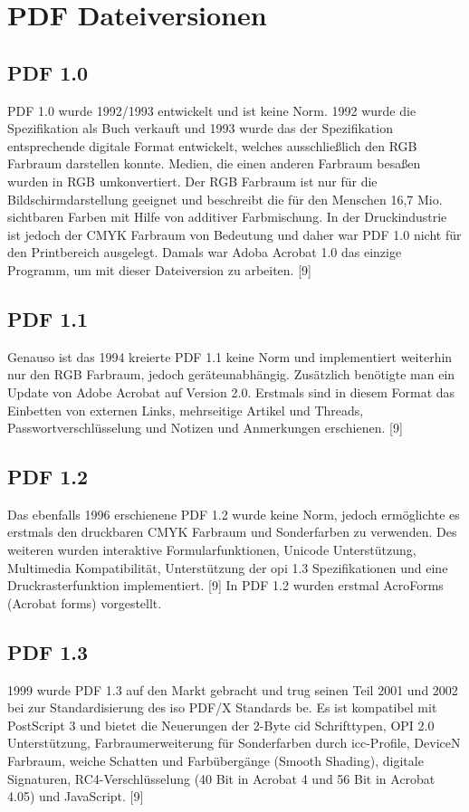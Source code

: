 \section{PDF Dateiversionen}

\subsection{PDF 1.0}
PDF 1.0 wurde 1992/1993 entwickelt und ist keine Norm. 1992 wurde die Spezifikation als Buch verkauft und 1993 wurde das der Spezifikation entsprechende digitale Format entwickelt, welches ausschließlich den RGB Farbraum darstellen konnte. Medien, die einen anderen Farbraum besaßen wurden in RGB umkonvertiert. Der RGB Farbraum ist nur für die Bildschirmdarstellung geeignet und beschreibt die für den Menschen 16,7 Mio. sichtbaren Farben mit Hilfe von additiver Farbmischung. In der Druckindustrie ist jedoch der CMYK Farbraum von Bedeutung und daher war PDF 1.0 nicht für den Printbereich ausgelegt. Damals war Adoba Acrobat 1.0 das einzige Programm, um mit dieser Dateiversion zu arbeiten. [9]

\subsection{PDF 1.1}
Genauso ist das 1994 kreierte PDF 1.1 keine Norm und implementiert weiterhin nur den RGB Farbraum, jedoch geräteunabhängig. Zusätzlich benötigte man ein Update von Adobe Acrobat auf Version 2.0. Erstmals sind in diesem Format das Einbetten von externen Links, mehrseitige Artikel und Threads, Passwortverschlüsselung und Notizen und Anmerkungen erschienen. [9]

\subsection{PDF 1.2}
Das ebenfalls 1996 erschienene PDF 1.2 wurde keine Norm, jedoch ermöglichte es erstmals den druckbaren CMYK Farbraum und Sonderfarben zu verwenden. Des weiteren wurden interaktive Formularfunktionen, Unicode Unterstützung, Multimedia Kompatibilität, Unterstützung der \gls{opi} 1.3 Spezifikationen und eine Druckrasterfunktion implementiert. [9] In PDF 1.2 wurden erstmal AcroForms (Acrobat forms) vorgestellt.

\subsection{PDF 1.3}
1999 wurde PDF 1.3 auf den Markt gebracht und trug seinen Teil 2001 und 2002 bei zur Standardisierung des \gls{iso} PDF/X Standards be. Es ist kompatibel mit PostScript 3 und bietet die Neuerungen der 2-Byte \gls{cid} Schrifttypen, OPI 2.0 Unterstützung, Farbraumerweiterung für Sonderfarben durch \gls{icc}-Profile, DeviceN Farbraum, weiche Schatten und Farbübergänge (Smooth Shading), digitale Signaturen, RC4-Verschlüsselung (40 Bit in Acrobat 4 und 56 Bit in Acrobat 4.05) und JavaScript. [9]


